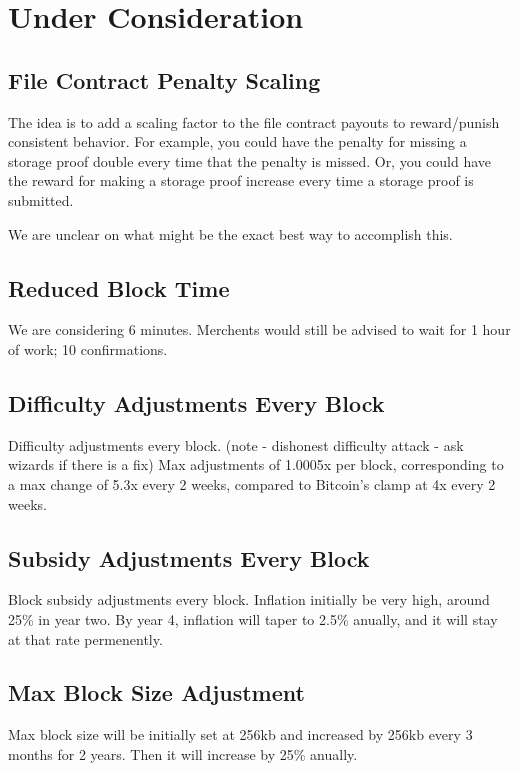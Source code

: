 \documentclass[twocolumn]{article}
\begin{document}
\section{Under Consideration}
\subsection{File Contract Penalty Scaling}
The idea is to add a scaling factor to the file contract payouts to reward/punish consistent behavior.
For example, you could have the penalty for missing a storage proof double every time that the penalty is missed.
Or, you could have the reward for making a storage proof increase every time a storage proof is submitted.

We are unclear on what might be the exact best way to accomplish this.

\subsection{Reduced Block Time}
We are considering 6 minutes.
Merchents would still be advised to wait for 1 hour of work; 10 confirmations.

\subsection{Difficulty Adjustments Every Block}
Difficulty adjustments every block. (note - dishonest difficulty attack - ask wizards if there is a fix)
Max adjustments of 1.0005x per block, corresponding to a max change of 5.3x every 2 weeks, compared to Bitcoin's clamp at 4x every 2 weeks.

\subsection{Subsidy Adjustments Every Block}
Block subsidy adjustments every block.
Inflation initially be very high, around 25\% in year two.
By year 4, inflation will taper to 2.5\% anually, and it will stay at that rate permenently.

\subsection{Max Block Size Adjustment}
Max block size will be initially set at 256kb and increased by 256kb every 3 months for 2 years.
Then it will increase by 25\% anually.
\end{document}
